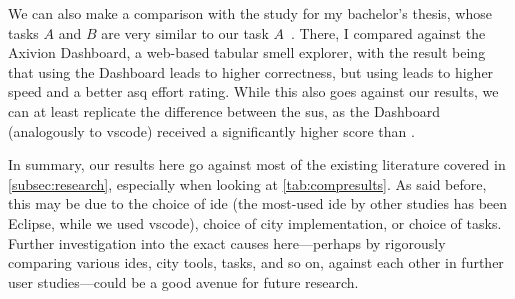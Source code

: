 \documentclass[../thesis]{subfiles}
\begin{document}
We can also make a comparison with the study for my bachelor's thesis, whose tasks $A$ and $B$ are very similar to our task $A$~\cite{galperin2022}.
There, I compared \SEE{} against the Axivion Dashboard, a web-based tabular \gls{smell} explorer, with the result being that using the Dashboard leads to higher correctness, but using \SEE{} leads to higher speed and a better \gls{asq} effort rating.
While this also goes against our results, we can at least replicate the difference between the \gls{sus}, as the Dashboard (analogously to \gls{vscode}) received a significantly higher score than \SEE{}.

In summary, our results here go against most of the existing literature covered in \cref{subsec:research}, especially when looking at \cref{tab:compresults}.
As said before, this may be due to the choice of \gls{ide} (the most-used \gls{ide} by other studies has been Eclipse, while we used \gls{vscode}), choice of \gls{city} implementation, or choice of tasks.
Further investigation into the exact causes here---perhaps by rigorously comparing various \glspl{ide}, \gls{city} tools, tasks, and so on, against each other in further user studies---could be a good avenue for future research.
\end{document}
